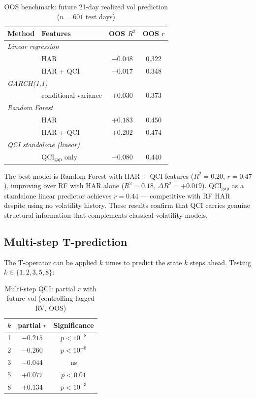 \documentclass[11pt,a4paper]{article}
\begin{document}
\begin{table}[h]
\centering
\caption{OOS benchmark: future 21-day realized vol prediction ($n = 601$ test days)}
\begin{tabular}{llcc}
\toprule
Method & Features & OOS $R^2$ & OOS $r$ \\
\midrule
\multicolumn{4}{l}{\emph{Linear regression}} \\
 & HAR & $-0.048$ & 0.322 \\
 & HAR + QCI & $-0.017$ & 0.348 \\
\midrule
\multicolumn{4}{l}{\emph{GARCH(1,1)}} \\
 & conditional variance & $+0.030$ & 0.373 \\
\midrule
\multicolumn{4}{l}{\emph{Random Forest}} \\
 & HAR & $+0.183$ & 0.450 \\
 & HAR + QCI & $\mathbf{+0.202}$ & $\mathbf{0.474}$ \\
\midrule
\multicolumn{4}{l}{\emph{QCI standalone (linear)}} \\
 & QCI$_\text{gap}$ only & $-0.080$ & 0.440 \\
\bottomrule
\end{tabular}
\end{table}

The best model is Random Forest with HAR + QCI features ($R^2 = 0.20$,
$r = 0.47$), improving over RF with HAR alone ($R^2 = 0.18$,
$\Delta R^2 = +0.019$). QCI$_\text{gap}$ as a standalone linear predictor
achieves $r = 0.44$ --- competitive with RF HAR despite using no volatility
history. These results confirm that QCI carries genuine structural
information that complements classical volatility models.

\subsection{Multi-step T-prediction}

The T-operator can be applied $k$ times to predict the state $k$ steps ahead.
Testing $k \in \{1,2,3,5,8\}$:

\begin{table}[h]
\centering
\caption{Multi-step QCI: partial $r$ with future vol (controlling lagged RV, OOS)}
\begin{tabular}{ccc}
\toprule
$k$ & partial $r$ & Significance \\
\midrule
1 & $-0.215$ & $p < 10^{-8}$ \\
2 & $\mathbf{-0.260}$ & $p < 10^{-8}$ \\
3 & $-0.044$ & ns \\
5 & $+0.077$ & $p < 0.01$ \\
8 & $+0.134$ & $p < 10^{-3}$ \\
\bottomrule
\end{tabular}
\end{table}
\end{document}
